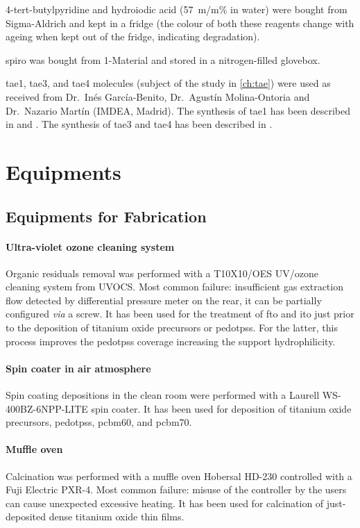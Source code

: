 	4-tert-butylpyridine and hydroiodic acid (57~m/m\% in water) were bought from Sigma-Aldrich and kept in a fridge (the colour of both these reagents change with ageing when kept out of the fridge, indicating degradation).

	\Gls{spiro} was bought from 1-Material and stored in a nitrogen-filled glovebox.

	\Gls{tae1}, \gls{tae3}, and \gls{tae4} molecules (subject of the study in \cref{ch:tae}) were used as received from Dr.\ Inés García-Benito, Dr.\ Agustín Molina-Ontoria and Dr.\ Nazario Martín (IMDEA, Madrid).
	The synthesis of \gls{tae1} has been described in  and .
	The synthesis of \gls{tae3} and \gls{tae4} has been described in .

\section{Equipments}

	\subsection{Equipments for Fabrication}

		\paragraph{Ultra-violet ozone cleaning system}
		Organic residuals removal was performed with a T10X10/OES UV/ozone cleaning system from UVOCS.
		Most common failure: insufficient gas extraction flow detected by differential pressure meter on the rear, it can be partially configured \textit{via} a screw.
		It has been used for the treatment of \gls{fto} and \gls{ito} just prior to the deposition of titanium oxide precursors or \gls{pedotpss}.
		For the latter, this process improves the \gls{pedotpss} coverage increasing the support hydrophilicity.

		\paragraph{Spin coater in air atmosphere}
		Spin coating depositions in the clean room were performed with a Laurell WS-400BZ-6NPP-LITE spin coater.
		It has been used for deposition of titanium oxide precursors, \gls{pedotpss}, \gls{pcbm60}, and \gls{pcbm70}.

		\paragraph{Muffle oven}
		Calcination was performed with a muffle oven Hobersal HD-230 controlled with a Fuji Electric PXR-4.
		Most common failure: misuse of the controller by the users can cause unexpected excessive heating.
		It has been used for calcination of just-deposited dense titanium oxide thin films.

